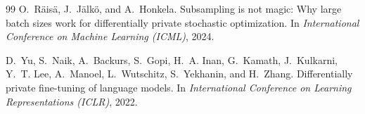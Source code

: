 \documentclass[11pt]{article}
\theoremstyle{plain}
\theoremstyle{definition}
\theoremstyle{remark}
\begin{document}
\begin{thebibliography}{99}
O.~R\"ais\"a, J.~J\"alk\"o, and A.~Honkela.
\newblock Subsampling is not magic: Why large batch sizes work for differentially private stochastic optimization.
\newblock In \emph{International Conference on Machine Learning (ICML)}, 2024.

D.~Yu, S.~Naik, A.~Backurs, S.~Gopi, H.~A. Inan, G.~Kamath, J.~Kulkarni, Y.~T. Lee, A.~Manoel, L.~Wutschitz, S.~Yekhanin, and H.~Zhang.
\newblock Differentially private fine-tuning of language models.
\newblock In \emph{International Conference on Learning Representations (ICLR)}, 2022.

\end{thebibliography}
\end{document}
